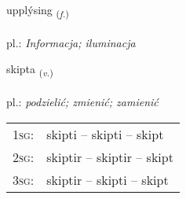 \documentclass[frontgrid, backgrid]{flacards}\usepackage[]{graphicx}\usepackage[]{xcolor}
\begin{document}
\renewcommand{\blhead}{\vskip5pt {\small\bfseries\footnotesize Nafnorð | Noun }}
\renewcommand{\bcfoot}{\vskip5pt \hspace{2pt}{\small\bfseries\footnotesize 1K}}


{upplýsing \small{\textsubscript{(\textit{f.})}} \\[1ex] %
\textphonetic{[ʏhplisiŋk]} \\
pl.: \emph{Informacja; iluminacja} \\  [2ex]
\renewcommand*{\arraystretch}{0.8}
}

\renewcommand{\flhead}{\vskip5pt \fboxsep=0pt {\small\bfseries\footnotesize Sagnorð | Verb}}
\renewcommand{\fcfoot}{\vskip5pt \fboxsep=0pt \hspace{2pt}{\small\bfseries\footnotesize 1K}}

\renewcommand{\blhead}{\vskip5pt {\small\bfseries\footnotesize Sagnorð | Verb }}
\renewcommand{\bcfoot}{\vskip5pt \hspace{2pt}{\small\bfseries\footnotesize 1K}}


{skipta \small{\textsubscript{(\textit{v.})}} \\[1ex] %
\textphonetic{[scɪfta]} \\
pl.: \emph{podzielić; zmienić; zamienić} \\  [2ex]
\renewcommand*{\arraystretch}{0.8}
\begin{tabular}{p{1cm}l}
\textsc{1sg}: & skipti -- skipti -- skipt \\ 
\textsc{2sg}: & skiptir -- skiptir -- skipt \\ 
\textsc{3sg}: & skiptir -- skipti -- skipt \\ 
\end{tabular}
}
\end{document}
